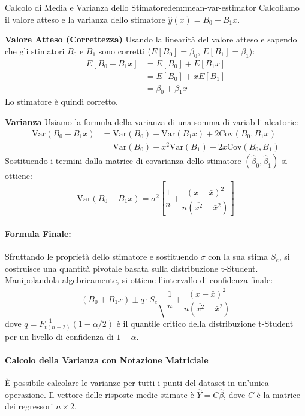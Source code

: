 \begin{dimostrazione}{Calcolo di Media e Varianza dello Stimatore}{dem:mean-var-estimator}
Calcoliamo il valore atteso e la varianza dello stimatore \(\hat{y}(x) = B_0 + B_1x\).

\textbf{Valore Atteso (Correttezza)}
Usando la linearità del valore atteso e sapendo che gli stimatori \(B_0\) e \(B_1\) sono corretti (\(E[B_0]=\beta_0\), \(E[B_1]=\beta_1\)):
\begin{align*}
    E[B_0 + B_1x] &= E[B_0] + E[B_1x] \\
    &= E[B_0] + xE[B_1] \\
    &= \beta_0 + \beta_1x
\end{align*}
Lo stimatore è quindi corretto.

\textbf{Varianza}
Usiamo la formula della varianza di una somma di variabili aleatorie:
\begin{align*}
    \text{Var}(B_0 + B_1x) &= \text{Var}(B_0) + \text{Var}(B_1x) + 2\text{Cov}(B_0, B_1x) \\
    &= \text{Var}(B_0) + x^2\text{Var}(B_1) + 2x\text{Cov}(B_0, B_1)
\end{align*}
Sostituendo i termini dalla matrice di covarianza dello stimatore \((\hat{\beta}_0, \hat{\beta}_1)\) si ottiene:
\[
    \text{Var}(B_0 + B_1 x) = \sigma^2 \left[ \frac{1}{n} + \frac{(x - \bar{x})^2}{n(\overline{x^2}-\bar{x}^2)} \right]
\]
\end{dimostrazione}

\paragraph{Formula Finale:} Sfruttando le proprietà dello stimatore e sostituendo \(\sigma\) con la sua stima \(S_e\), si costruisce una quantità pivotale basata sulla distribuzione t-Student. Manipolandola algebricamente, si ottiene l'intervallo di confidenza finale:
\[
    (B_0 + B_1 x) \pm q \cdot S_e \sqrt{\frac{1}{n} + \frac{(x - \bar{x})^2}{n(\overline{x^2}-\bar{x}^2)}}
\]
dove \(q = F_{t(n-2)}^{-1}(1 - \alpha/2)\) è il quantile critico della distribuzione t-Student per un livello di confidenza di \(1-\alpha\).

\paragraph{Calcolo della Varianza con Notazione Matriciale}
È possibile calcolare le varianze per tutti i punti del dataset in un'unica operazione. Il vettore delle risposte medie stimate è \(\hat{Y} = C \hat{\beta}\), dove \(C\) è la matrice dei regressori \(n \times 2\).

